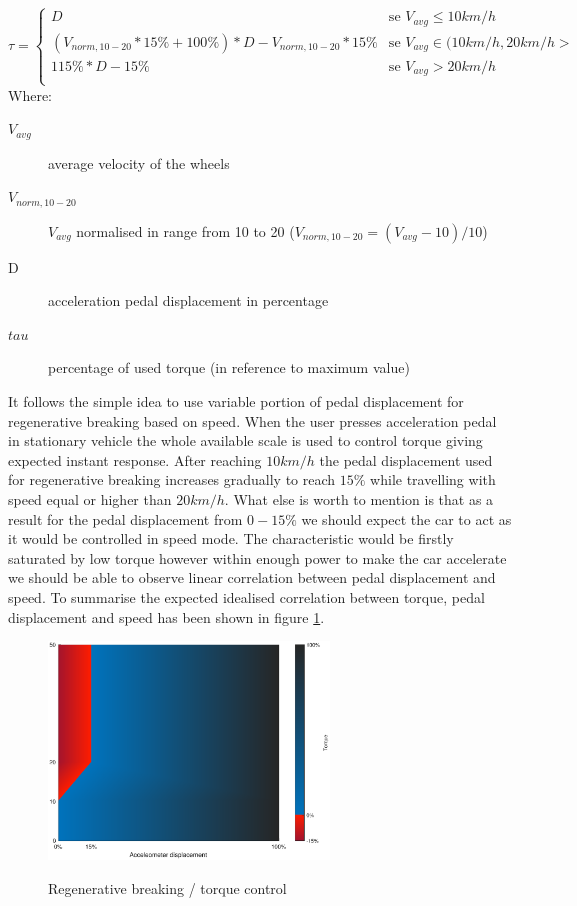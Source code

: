 \begin{equation*}
    \tau = \begin{cases}
        D & \text{se $V_{avg} \leq 10km/h$}\\
        (V_{norm,10-20} * 15\% + 100\%) * D - V_{norm,10-20} * 15\% & \text{se $V_{avg} \in (10km/h,20km/h>$}\\
        115\% * D - 15\% & \text{se $V_{avg} > 20km/h$}\\
    \end{cases}
    \label{reg_break_eq}
\end{equation*}
Where:
\begin{description}
    \item[$V_{avg}$] average velocity of the wheels 
    \item[$V_{norm,10-20}$] $V_{avg}$ normalised in range from 10 to 20 ($V_{norm,10-20}=(V_{avg}-10)/10$)
    \item[D] acceleration pedal displacement in percentage
    \item[$tau$] percentage of used torque (in reference to maximum value)
\end{description}

It follows the simple idea to use variable portion of pedal displacement for regenerative breaking based on speed.
When the user presses acceleration pedal in stationary vehicle the whole available scale is used to control torque giving expected instant response. After reaching $10km/h$ the pedal  displacement used for regenerative breaking increases gradually to reach $15\%$ while travelling with speed equal or higher than $20km/h$.
What else is worth to mention is that as a result for the pedal displacement from $0-15\%$ we should expect the car to act as it would be controlled in speed mode. The characteristic would be firstly saturated by low torque however within enough power to make the car accelerate we should be able to observe linear correlation between pedal displacement and speed.
To summarise the expected idealised correlation between torque, pedal displacement and speed has been shown in figure \ref{regen_ideal}.

\begin{figure}[h]
    \centering
           \includegraphics[height=5.8cm]{figures/regen_ideal}
            \label{regen_ideal}
        \caption{Regenerative breaking / torque control}
\end{figure}